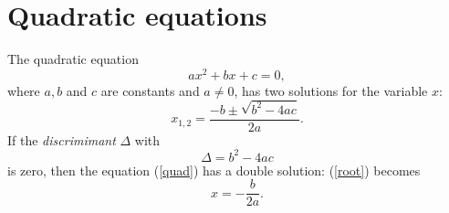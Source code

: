 \documentclass{article}
\begin{document}
\thispagestyle{empty}
\section*{Quadratic equations}
The quadratic equation
\begin{equation}
  \label{quad}
  ax^2 + bx + c = 0,
\end{equation}
where \( a, b \) and \( c \) are constants and \( a \neq 0 \),
has two solutions for the variable \( x \):
\begin{equation}
  \label{root}
  x_{1,2} = \frac{-b \pm \sqrt{b^2-4ac}}{2a}. 
\end{equation}
If the \emph{discrimimant} \( \Delta \) with
\[
  \Delta = b^2 - 4ac
\]
is zero, then the equation (\ref{quad}) has a double solution: (\ref{root}) becomes
\[
  x = - \frac{b}{2a}.
\]
\end{document}
